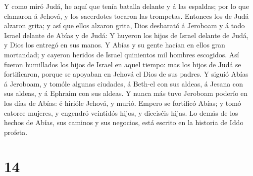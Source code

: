 Y como miró Judá, he aquí que tenía batalla delante y á
las espaldas; por lo que clamaron á Jehová, y los sacerdotes tocaron las
trompetas.  Entonces los de Judá alzaron grita; y así que
ellos alzaron grita, Dios desbarató á Jeroboam y á todo Israel delante
de Abías y de Judá:  Y huyeron los hijos de Israel delante
de Judá, y Dios los entregó en sus manos.  Y Abías y su
gente hacían en ellos gran mortandad; y cayeron heridos de Israel
quinientos mil hombres escogidos.  Así fueron humillados
los hijos de Israel en aquel tiempo: mas los hijos de Judá se
fortificaron, porque se apoyaban en Jehová el Dios de sus padres.
 Y siguió Abías á Jeroboam, y tomóle algunas ciudades, á
Beth-el con sus aldeas, á Jesana con sus aldeas, y á Ephraim con sus
aldeas.  Y nunca más tuvo Jeroboam poderío en los días de
Abías: é hirióle Jehová, y murió.  Empero se fortificó
Abías; y tomó catorce mujeres, y engendró veintidós hijos, y dieciséis
hijas.  Lo demás de los hechos de Abías, sus caminos y sus
negocios, está escrito en la historia de Iddo profeta.

\hypertarget{section-13}{%
\section{14}\label{section-13}}

